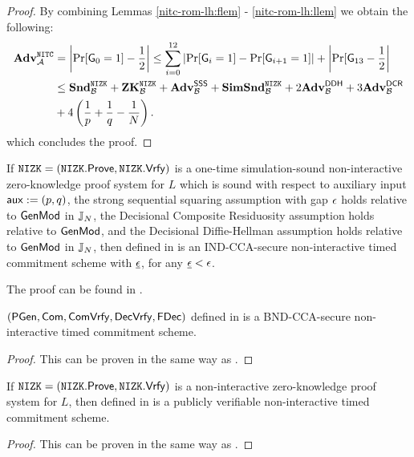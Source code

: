 \begin{proof}
By combining Lemmas \ref{nitc-rom-lh:flem} - \ref{nitc-rom-lh:llem} we obtain the following:
\begin{align*}
\mathbf{Adv}^{\mathtt{NITC}}_{\mathcal{A}} &= \left| \Pr[\mathsf{G}_0 = 1] - \frac{1}{2} \right| \leq \sum_{i=0}^{12} \left|\Pr[\mathsf{G}_i = 1] - \Pr[\mathsf{G}_{i+1} = 1] \right| + \left|\Pr[\mathsf{G}_{13}- \frac{1}{2}\right| \\
 &\leq  \mathbf{Snd}^{\mathtt{NIZK}}_{\mathcal{B}} + \mathbf{ZK}^{\mathtt{NIZK}}_{\mathcal{B}} + \mathbf{Adv}^{\mathsf{SSS}}_{\mathcal{B}} + \mathbf{SimSnd}^{\mathtt{NIZK}}_{\mathcal{B}} + 2 \mathbf{Adv}^{\mathsf{DDH}}_{\mathcal{B}} + 3 \mathbf{Adv}^{\mathsf{DCR}}_{\mathcal{B}} \\ &+ 4 \left( \frac{1}{p}+\frac{1}{q}-\frac{1}{N} \right).
\end{align*}
which concludes the proof.
\end{proof}



\begin{theorem}
\label{thm:NITC-lin-ROM}
If $\mathtt{NIZK} = (\mathtt{NIZK}.\mathsf{Prove}, \mathtt{NIZK}.\mathsf{Vrfy})$ is a one-time simulation-sound non-interactive zero-knowledge proof system for $L$ which is sound with respect to auxiliary input $\mathsf{aux}:=(p,q)$, the strong sequential squaring assumption with gap $\epsilon$ holds relative to $\mathsf{GenMod}$ in $\mathbb{J}_N$, the Decisional Composite Residuosity assumption holds relative to $\mathsf{GenMod}$, and the Decisional Diffie-Hellman assumption holds relative to $\mathsf{GenMod}$ in $\mathbb{J}_N$, then \mathlist{(\pgen, \com, \cvrfy, \dvrfy, \fdecom)} defined in  is an IND-CCA-secure non-interactive timed commitment scheme with $\underline{\epsilon}$, for any $\underline{\epsilon} < \epsilon$. 
\end{theorem}
The proof can be found in .

\begin{theorem}
$(\mathsf{PGen}, \mathsf{Com}, \mathsf{ComVrfy}, \mathsf{DecVrfy}, \mathsf{FDec})$ defined in  is a BND-CCA-secure non-interactive timed commitment scheme. 
\end{theorem}
{}
\begin{proof}
This can be proven in the same way as .
\end{proof}

\begin{theorem}
If $\mathtt{NIZK} = (\mathtt{NIZK}.\mathsf{Prove}, \mathtt{NIZK}.\mathsf{Vrfy})$ is a non-interactive zero-knowledge proof system for $L$, then \mathlist{(\pgen, \com, \cvrfy, \dvrfy, \fdecom, \fdvrfy)} defined in  is a publicly verifiable non-interactive timed commitment scheme.
\end{theorem}

\begin{proof}
This can be proven in the same way as .
\end{proof}

